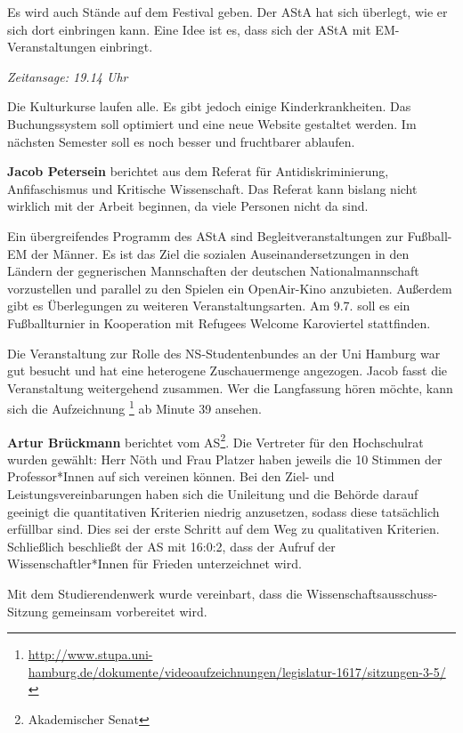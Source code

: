 \documentclass[ngerman,headheight=70pt]{scrartcl}
\begin{document}
    Es wird auch Stände auf dem Festival geben. Der AStA hat sich überlegt, wie
    er sich dort einbringen kann. Eine Idee ist es, dass sich der AStA mit
    EM-Veranstaltungen einbringt.

    \textit{Zeitansage: 19.14 Uhr}

    Die Kulturkurse laufen alle. Es gibt jedoch einige Kinderkrankheiten. Das
    Buchungssystem soll optimiert und eine neue Website gestaltet werden. Im
    nächsten Semester soll es noch besser und fruchtbarer ablaufen.

    \textbf{Jacob Petersein} berichtet aus dem Referat für Antidiskriminierung,
    Anfifaschismus und Kritische Wissenschaft. Das Referat kann bislang nicht
    wirklich mit der Arbeit beginnen, da viele Personen nicht da sind.

    Ein übergreifendes Programm des AStA sind Begleitveranstaltungen zur Fußball-EM
    der Männer. Es ist das Ziel die sozialen Auseinandersetzungen in den Ländern
    der gegnerischen Mannschaften der deutschen Nationalmannschaft
    vorzustellen und parallel zu den Spielen ein OpenAir-Kino anzubieten. Außerdem
    gibt es Überlegungen zu weiteren Veranstaltungsarten. Am 9.7. soll es ein
    Fußballturnier in Kooperation mit Refugees Welcome Karoviertel stattfinden.

    Die Veranstaltung zur Rolle des NS-Studentenbundes an der Uni Hamburg war
    gut besucht und hat eine heterogene Zuschauermenge angezogen. Jacob fasst
    die Veranstaltung weitergehend zusammen. Wer die Langfassung hören möchte,
    kann sich die Aufzeichnung
    \footnote{\url{http://www.stupa.uni-hamburg.de/dokumente/videoaufzeichnungen/legislatur-1617/sitzungen-3-5/}}
    ab Minute 39 ansehen.

    \textbf{Artur Brückmann} berichtet vom AS\footnote{Akademischer Senat}.
    Die Vertreter für den Hochschulrat wurden gewählt: Herr Nöth und Frau Platzer
    haben jeweils die 10 Stimmen der Professor*Innen auf sich vereinen können.
    Bei den Ziel- und Leistungsvereinbarungen haben sich die Unileitung und die
    Behörde darauf geeinigt die quantitativen Kriterien niedrig anzusetzen, sodass
    diese tatsächlich erfüllbar sind. Dies sei der erste Schritt auf dem Weg zu
    qualitativen Kriterien. Schließlich beschließt der AS mit 16:0:2, dass der
    Aufruf der Wissenschaftler*Innen für Frieden unterzeichnet wird.

    Mit dem Studierendenwerk wurde vereinbart, dass die
    Wissenschaftsausschuss-Sitzung gemeinsam vorbereitet wird.
\end{document}
